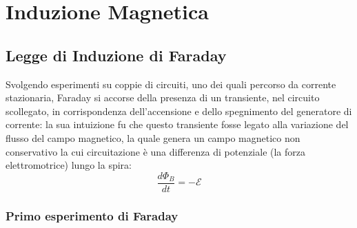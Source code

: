 \section{Induzione Magnetica}

\subsection{Legge di Induzione di Faraday}

Svolgendo esperimenti su coppie di circuiti, uno dei quali percorso da corrente stazionaria, Faraday si accorse della presenza di un transiente, nel circuito scollegato, in corrispondenza dell'accensione e dello spegnimento del generatore di corrente: la sua intuizione fu che questo transiente fosse legato alla variazione del flusso del campo magnetico, la quale genera un campo magnetico non conservativo la cui circuitazione è una differenza di potenziale (la forza elettromotrice) lungo la spira:
\begin{equation}
	\frac{d\Phi_B}{dt} = -\mathcal{E}
	\label{eq:1}
\end{equation}

\subsubsection{Primo esperimento di Faraday}

